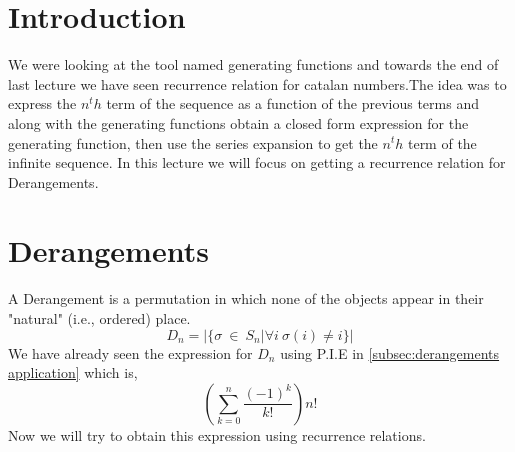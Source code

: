 
\section{Introduction}
We were looking at the tool named generating functions and towards the end of last lecture we have seen recurrence relation for catalan numbers.The idea was to express the $n^th$ term of the sequence as a function of the previous terms and along with the generating functions obtain a closed form expression for the generating function, then use the series expansion to get the $n^th$ term of the infinite sequence.
In this lecture we will focus on getting a recurrence relation for Derangements. 

\section{Derangements}\label{Derangements}
A Derangement is a permutation in which none of the objects appear in their "natural" (i.e., ordered) place.
$$
D_n = | \{\sigma ~\in~ S_n | \forall i ~\sigma(i)\neq i\}|
$$
We have already seen the expression for $D_n$ using P.I.E in \ref{subsec:derangements application}
which is,
$$
(\sum_{k=0}^{n} \frac{(-1)^k}{k!})n!
$$
Now we will try to obtain this expression using recurrence relations. 
